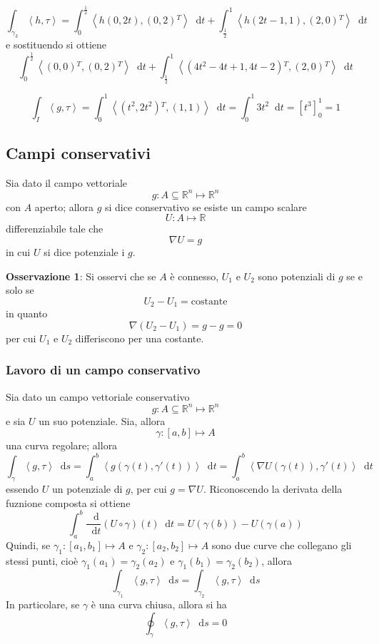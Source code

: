 \documentclass[a4paper]{extarticle}
\newcommand*\dif{\mathop{}\!\mathrm{d}}
\begin{document}
\vspace{1em}
\noindent
\[\int_{\gamma_3} \left<h,\tau\right> = \int_0^{\frac{1}{2}} \left<h(0,2t),(0,2){^T}\right> \dif t + \int_{\frac{1}{2}}^1 \left<h(2t-1,1),(2,0){^T}\right> \dif t\]
e sostituendo si ottiene
\[\int_0^{\frac{1}{2}} \left<(0,0){^T},(0,2){^T}\right> \dif t + \int_{\frac{1}{2}}^1 \left<(4t^2-4t+1,4t - 2){^T},(2,0){^T}\right> \dif t \]


\[\int_I \left<g,\tau\right> = \int_0^1 \left<(t^2,2t^2){^T},(1,1)\right>\dif t = \int_0^1 3t^2 \dif t = \left[t^3\right]_0^1 = 1\]

\vspace{1em}
\subsection{Campi conservativi}
Sia dato il campo vettoriale
\[g : A \subseteq \mathbb{R}^n \longmapsto \mathbb{R}^n\]
con $A$ aperto; allora $g$ si dice conservativo se esiste un campo scalare
\[U : A \longmapsto \mathbb{R}\]
differenziabile tale che
\[\nabla U = g\]
in cui $U$ si dice potenziale i $g$.

\vspace{1em}
\noindent
\textbf{Osservazione 1}: Si osservi che se $A$ è connesso, $U_1$ e $U_2$ sono potenziali di $g$ se e solo se
\[U_2-U_1=\text{costante}\]
in quanto
\[\nabla (U_2-U_1) = g-g=0\]
per cui $U_1$ e $U_2$ differiscono per una costante.

\vspace{1em}
\noindent
\subsubsection{Lavoro di un campo conservativo}
Sia dato un campo vettoriale conservativo
\[g : A \subseteq \mathbb{R}^n \longmapsto \mathbb{R}^n\]
e sia $U$ un suo potenziale. Sia, allora
\[\gamma : [a,b] \longmapsto A\]
una curva regolare; allora
\[\int_\gamma \left<g,\tau\right> \dif s = \int_a^b \left<g(\gamma(t),\gamma'(t))\right> \dif t = \int_a^b \left<\nabla U(\gamma(t)), \gamma'(t)\right> \dif t\]
essendo $U$ un potenziale di $g$, per cui $g=\nabla U$. Riconoscendo la derivata della fuznione composta si ottiene
\[\int_a^b \dfrac{\dif}{\dif t} \left(U \circ \gamma\right)(t) \dif t = U(\gamma(b)) - U(\gamma(a))\]
Quindi, se $\gamma_1 : [a_1,b_1] \longmapsto A$ e $\gamma_2 : [a_2,b_2] \longmapsto A$ sono due curve che collegano gli stessi punti, cioè $\gamma_1(a_1)=\gamma_2(a_2)$ e $\gamma_1(b_1)=\gamma_2(b_2)$, allora
\[\int_{\gamma_1} \left<g,\tau\right> \dif s = \int_{\gamma_2} \left<g,\tau\right> \dif s\]
In particolare, se $\gamma$ è una curva chiusa, allora si ha
\[\oint_\gamma \left<g,\tau\right> \dif s = 0\]
\end{document}
